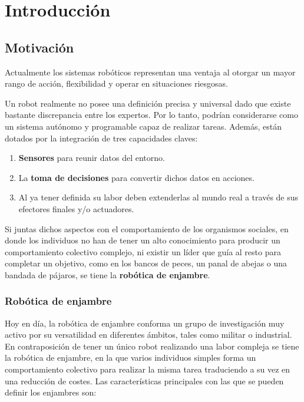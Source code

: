 

\chapter{Introducción} 
\label{ch:chapter1}
\setlength{\parindent}{0cm}
\setlength{\parskip}{4mm}

\section{Motivación}

Actualmente los sistemas robóticos representan una ventaja al otorgar un mayor rango de acción, flexibilidad y operar en situaciones riesgosas.

Un robot realmente no posee una definición precisa y universal dado que existe bastante discrepancia entre los expertos. Por lo tanto, podrían considerarse como un sistema autónomo y programable capaz de realizar tareas. Además, están dotados por la integración de tres capacidades claves:

\begin{enumerate}
	\item \textbf{Sensores} para reunir datos del entorno.
	\item La \textbf{toma de decisiones} para convertir dichos datos en acciones.
	\item Al ya tener definida su labor deben extenderlas al mundo real a través de sus efectores finales y/o actuadores.
\end{enumerate}

Si juntas dichos aspectos con el comportamiento de los organismos sociales, en donde los individuos no han de tener un alto conocimiento para producir un comportamiento colectivo complejo, ni existir un líder que guía al resto para completar un objetivo, como en los bancos de peces, un panal de abejas o una bandada de pájaros, se tiene la \textbf{robótica de enjambre}.

\newpage

\subsection{Robótica de enjambre}


Hoy en día, la robótica de enjambre conforma un grupo de investigación muy activo por su versatilidad en diferentes ámbitos, tales como militar o industrial. En contraposición de tener un único robot realizando una labor compleja se tiene la robótica de enjambre, en la que varios individuos simples forma un comportamiento colectivo para realizar la misma tarea traduciendo a su vez en una reducción de costes. Las características principales con las que se pueden definir los enjambres son:

